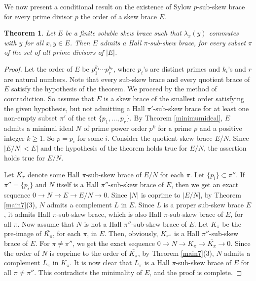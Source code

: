 \documentclass[11pt]{amsart}
\theoremstyle{thrm}
\theoremstyle{plain}
\newtheorem{thm}{Theorem}[section]
\theoremstyle{definition}
\numberwithin{equation}{section}
\begin{document}
We now present a conditional result on the existence of Sylow $p$-sub-skew brace for every prime divisor $p$ the order of a skew brace $E$.

\begin{thm}
	Let \( E \) be a finite soluble skew brace  such that $\lambda_x(y)$ commutes with  $y$ for all $x, y \in E$.  Then \( E \)  admits a Hall $\pi$-sub-skew brace,  for every subset $\pi$ of the set of all prime divisors of $|E|$.
\end{thm}

\begin{proof}
Let the  order  of $E$ be  \(p_1^{k_1} \cdots p_r^{k_r}\), where $p_i$'s are distinct primes and $k_i$'s and $r$ are natural numbers.  Note that every sub-skew brace and every quotient brace of $E$ satisfy the hypothesis of the theorem.  We proceed by the method of contradiction. So assume that $E$ is  a skew brace of the  smallest order satisfying the given hypothesis, but  not admitting a Hall $\pi'$-sub-skew brace for at least one non-empty subset $\pi'$ of the set $\{p_1, \ldots, p_r\}$.  By Theorem \ref{minimumideal}, $E$ admits a minimal ideal $N$ of prime power order $p^k$ for a prime $p$ and a positive integer $k \ge 1$. So $p = p_i$ for some $i$. Consider the quotient skew brace $E/N$.  Since
 $|E/N| < E|$ and the hypothesis of the theorem holds true for $E/N$,  the assertion holds true for $E/N$.  

Let $\bar{K_{\pi}}$ denote some  Hall $\pi$-sub-skew brace  of $E/N$ for each $\pi$. Let $\{p_i\} \subset \pi''$. If $\pi'' = \{p_i\}$ and  $N$ itself is a Hall $\pi''$-sub-skew brace of $E$, then   we get an exact sequence $0 \to N \to E \to E/N \to 0$. Since $|N|$ is coprime to $|E/N|$, by Theorem \ref{main7}(3), $N$ admits a complement $L$ in $E$. Since $L$ is a proper sub-skew brace  $E$, it admits Hall $\pi$-sub-skew brace, which is also  Hall $\pi$-sub-skew brace of $E$, for all  $\pi$. Now assume that $N$  is not a Hall $\pi''$-sub-skew brace of $E$.  Let $K_{\pi}$ be the pre-image of \( \bar{K_{\pi}} \),  for each $\pi$, in \( E \). Then, obviously, $K_{\pi''}$ is a Hall $\pi''$-sub-skew brace of $E$. For $\pi \ne \pi''$, we get the exact sequence $0 \to N \to K_{\pi} \to \bar{K_{\pi}} \to 0$. Since the order of $N$ is coprime to the order of  $\bar{K_{\pi}}$, by Theorem \ref{main7}(3), $N$ admits a complement $L_{\pi}$ in $K_{\pi}$. It is now clear that $L_{\pi}$ is a Hall $\pi$-sub-skew brace of $E$ for all $\pi \ne \pi''$. This contradicts the minimality of $E$, and the proof is complete.
\end{proof}
\end{document}
